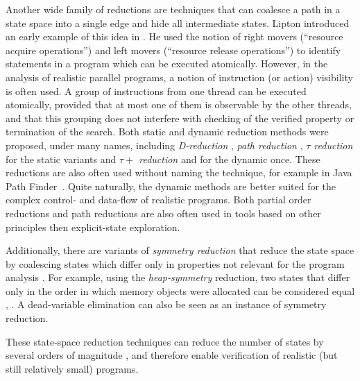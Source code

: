 Another wide family of reductions are techniques that can coalesce a path in a
state space into a single edge and hide all intermediate states.
Lipton introduced an early example of this idea in .
He used the notion of right movers (``resource acquire operations'') and
left movers (``resource release operations'') to identify statements in a
program which can be executed atomically.
However, in the analysis of realistic parallel programs, a notion of instruction (or action) visibility is often used.
A group of instructions from one thread can
be executed atomically, provided that at most one of them is observable by the
other threads, and that this grouping does not interfere with checking of the
verified property or termination of the search.
Both static and dynamic reduction methods were proposed, under many names,
including \emph{D-reduction} , \emph{path reduction}
, \emph{$\tau$ reduction}  for the static
variants and \emph{$\tau+$ reduction}  and  for the dynamic once.
These reductions are also often used without naming the technique, for example in
Java Path Finder~.
Quite naturally, the dynamic methods are better suited for the complex control-
and data-flow of realistic programs.
Both partial order reductions and path reductions are also often used in tools
based on other principles then explicit-state exploration.

Additionally, there are variants of \emph{symmetry reduction} that reduce the
state space by coalescing states which differ only in properties not relevant
for the program analysis .
For example, using the \emph{heap-symmetry} reduction, two states that differ
only in the order in which memory objects were allocated can be considered
equal , .
A dead-variable elimination  can also be seen as an instance
of symmetry reduction.

These state-space reduction techniques can reduce the number of states by
several orders of magnitude , and therefore enable verification of
realistic (but still relatively small) programs.

